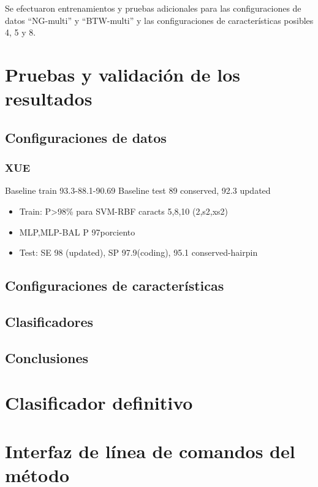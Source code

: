 \documentclass[12pt,bibliography=oldstyle,DIV=12,parskip=half-,titlepage]{scrartcl}
\begin{document}
Se efectuaron entrenamientos y pruebas adicionales para las
configuraciones de datos ``NG-multi'' y ``BTW-multi'' y las
configuraciones de características posibles 4, 5 y 8.
%
\section{Pruebas y validación de los resultados}
\subsection{Configuraciones de datos}
\subsubsection{XUE}
Baseline train 93.3-88.1-90.69
Baseline test 89 conserved, 92.3 updated
\begin{itemize}
\item Train: P>98\% para SVM-RBF caracts 5,8,10 (2,s2,xs2)
\item MLP,MLP-BAL P 97porciento
\item Test: SE 98 (updated), SP 97.9(coding),  95.1 conserved-hairpin
\end{itemize}
\subsection{Configuraciones de características}
\subsection{Clasificadores}
\subsection{Conclusiones}
\section{Clasificador definitivo}

\section{Interfaz de línea de comandos del método}
\end{document}
